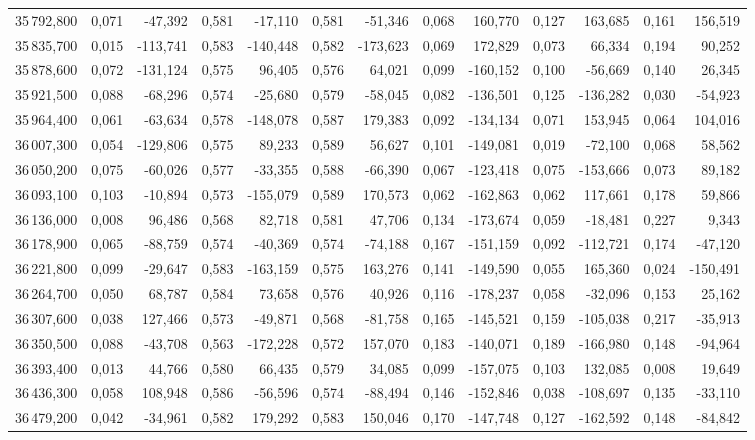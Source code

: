 \begin{longtable}{rrrrrrrrrrrrr}
35\,792,800 & 0,071 & -47,392 & 0,581 & -17,110 & 0,581 & -51,346 & 0,068 & 160,770 & 0,127 & 163,685 & 0,161 & 156,519\\
35\,835,700 & 0,015 & -113,741 & 0,583 & -140,448 & 0,582 & -173,623 & 0,069 & 172,829 & 0,073 & 66,334 & 0,194 & 90,252\\
35\,878,600 & 0,072 & -131,124 & 0,575 & 96,405 & 0,576 & 64,021 & 0,099 & -160,152 & 0,100 & -56,669 & 0,140 & 26,345\\
35\,921,500 & 0,088 & -68,296 & 0,574 & -25,680 & 0,579 & -58,045 & 0,082 & -136,501 & 0,125 & -136,282 & 0,030 & -54,923\\
35\,964,400 & 0,061 & -63,634 & 0,578 & -148,078 & 0,587 & 179,383 & 0,092 & -134,134 & 0,071 & 153,945 & 0,064 & 104,016\\
36\,007,300 & 0,054 & -129,806 & 0,575 & 89,233 & 0,589 & 56,627 & 0,101 & -149,081 & 0,019 & -72,100 & 0,068 & 58,562\\
36\,050,200 & 0,075 & -60,026 & 0,577 & -33,355 & 0,588 & -66,390 & 0,067 & -123,418 & 0,075 & -153,666 & 0,073 & 89,182\\
36\,093,100 & 0,103 & -10,894 & 0,573 & -155,079 & 0,589 & 170,573 & 0,062 & -162,863 & 0,062 & 117,661 & 0,178 & 59,866\\
36\,136,000 & 0,008 & 96,486 & 0,568 & 82,718 & 0,581 & 47,706 & 0,134 & -173,674 & 0,059 & -18,481 & 0,227 & 9,343\\
36\,178,900 & 0,065 & -88,759 & 0,574 & -40,369 & 0,574 & -74,188 & 0,167 & -151,159 & 0,092 & -112,721 & 0,174 & -47,120\\
36\,221,800 & 0,099 & -29,647 & 0,583 & -163,159 & 0,575 & 163,276 & 0,141 & -149,590 & 0,055 & 165,360 & 0,024 & -150,491\\
36\,264,700 & 0,050 & 68,787 & 0,584 & 73,658 & 0,576 & 40,926 & 0,116 & -178,237 & 0,058 & -32,096 & 0,153 & 25,162\\
36\,307,600 & 0,038 & 127,466 & 0,573 & -49,871 & 0,568 & -81,758 & 0,165 & -145,521 & 0,159 & -105,038 & 0,217 & -35,913\\
36\,350,500 & 0,088 & -43,708 & 0,563 & -172,228 & 0,572 & 157,070 & 0,183 & -140,071 & 0,189 & -166,980 & 0,148 & -94,964\\
36\,393,400 & 0,013 & 44,766 & 0,580 & 66,435 & 0,579 & 34,085 & 0,099 & -157,075 & 0,103 & 132,085 & 0,008 & 19,649\\
36\,436,300 & 0,058 & 108,948 & 0,586 & -56,596 & 0,574 & -88,494 & 0,146 & -152,846 & 0,038 & -108,697 & 0,135 & -33,110\\
36\,479,200 & 0,042 & -34,961 & 0,582 & 179,292 & 0,583 & 150,046 & 0,170 & -147,748 & 0,127 & -162,592 & 0,148 & -84,842\\

\end{longtable}

